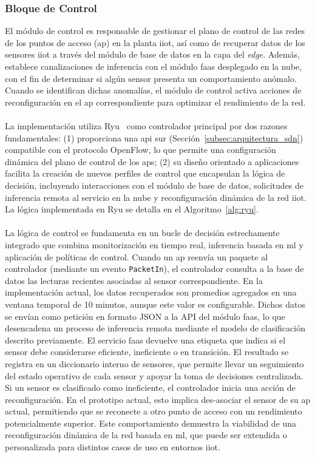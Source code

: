 \subsubsection{Bloque de Control}

El módulo de control es responsable de gestionar el plano de control de las redes de los puntos de acceso (\gls{ap}) en la planta \gls{iiot}, así como de recuperar datos de los sensores \gls{iiot} a través del módulo de base de datos en la capa del \textit{edge}. Además, establece canalizaciones de inferencia con el módulo \gls{faas} desplegado en la nube, con el fin de determinar si algún sensor presenta un comportamiento anómalo. Cuando se identifican dichas anomalías, el módulo de control activa acciones de reconfiguración en el \gls{ap} correspondiente para optimizar el rendimiento de la red.\\
\\
La implementación utiliza Ryu~\cite{tomonori2013introduction} como controlador principal por dos razones fundamentales: (1) proporciona una \gls{api} sur (Sección~\ref{subsec:arquitectura_sdn}) compatible con el protocolo OpenFlow, lo que permite una configuración dinámica del plano de control de los \glspl{ap}; (2) su diseño orientado a aplicaciones facilita la creación de nuevos perfiles de control que encapsulan la lógica de decisión, incluyendo interacciones con el módulo de base de datos, solicitudes de inferencia remota al servicio en la nube y reconfiguración dinámica de la red \gls{iiot}. La lógica implementada en Ryu se detalla en el Algoritmo~\ref{alg:ryu}.\\
\\
La lógica de control se fundamenta en un bucle de decisión estrechamente integrado que combina monitorización en tiempo real, inferencia basada en \gls{ml} y aplicación de políticas de control. Cuando un \gls{ap} reenvía un paquete al controlador (mediante un evento \texttt{PacketIn}), el controlador consulta a la base de datos las lecturas recientes asociadas al sensor correspondiente. En la implementación actual, los datos recuperados son promedios agregados en una ventana temporal de 10 minutos, aunque este valor es configurable. Dichos datos se envían como petición en formato JSON a la API del módulo \gls{faas}, lo que desencadena un proceso de inferencia remota mediante el modelo de clasificación descrito previamente. El servicio \gls{faas} devuelve una etiqueta que indica si el sensor debe considerarse eficiente, ineficiente o en transición. El resultado se registra en un diccionario interno de sensores, que permite llevar un seguimiento del estado operativo de cada sensor y apoyar la toma de decisiones centralizada. Si un sensor es clasificado como ineficiente, el controlador inicia una acción de reconfiguración. En el prototipo actual, esto implica des-asociar el sensor de su \gls{ap} actual, permitiendo que se reconecte a otro punto de acceso con un rendimiento potencialmente superior. Este comportamiento demuestra la viabilidad de una reconfiguración dinámica de la red basada en \gls{ml}, que puede ser extendida o personalizada para distintos casos de uso en entornos \gls{iiot}.

